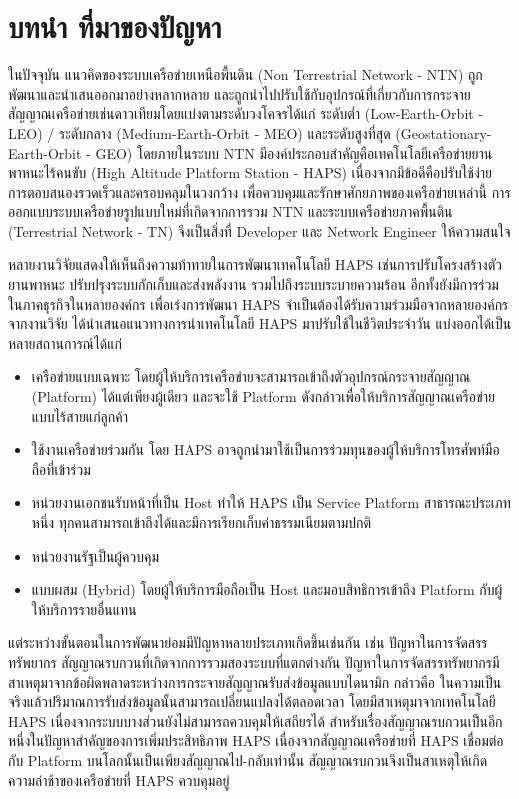 \section{บทนำ ที่มาของปัญหา}

ในปัจจุบัน แนวคิดของระบบเครือข่ายเหนือพื้นดิน (Non Terrestrial Network - NTN) ถูกพัฒนาและนำเสนออกมาอย่างหลากหลาย
และถูกนำไปปรับใช้กับอุปกรณ์ที่เกี่ยวกับการกระจายสัญญาณเครือข่ายเช่นดาวเทียมโดยแบ่งตามระดับวงโคจรได้แก่ ระดับต่ำ (Low-Earth-Orbit - LEO) /
ระดับกลาง (Medium-Earth-Orbit - MEO) และระดับสูงที่สุด (Geostationary-Earth-Orbit - GEO)
โดยภายในระบบ NTN มีองค์ประกอบสำคัญคือเทคโนโลยีเครือข่ายยานพาหนะไร้คนขับ (High Altitude Platform Station - HAPS)
เนื่องจากมีข้อดีคือปรับใช้ง่าย การตอบสนองรวดเร็วและครอบคลุมในวงกว้าง เพื่อควบคุมและรักษาศักยภาพของเครือข่ายเหล่านี้ 
การออกแบบระบบเครือข่ายรูปแบบใหม่ที่เกิดจากการรวม NTN และระบบเครือข่ายภาคพื้นดิน (Terrestrial Network - TN) 
จึงเป็นสิ่งที่ Developer และ Network Engineer ให้ความสนใจ

หลายงานวิจัยแสดงให้เห็นถึงความท้าทายในการพัฒนาเทคโนโลยี HAPS เช่นการปรับโครงสร้างตัวยานพาหนะ ปรับปรุงระบบกักเก็บและส่งพลังงาน
รวมไปถึงระบบระบายความร้อน อีกทั้งยังมีการร่วมในภาคธุรกิจในหลายองค์กร เพื่อเร่งการพัฒนา HAPS จำเป็นต้องได้รับความร่วมมือจากหลายองค์กร
จากงานวิจัย \cite{gsmatowers}
ได้นำเสนอแนวทางการนำเทคโนโลยี HAPS มาปรับใช้ในชีวิตประจำวัน แบ่งออกได้เป็นหลายสถานการณ์ได้แก่

\begin{itemize}
    \item เครือข่ายแบบเฉพาะ โดยผู้ให้บริการเครือข่ายจะสามารถเข้าถึงตัวอุปกรณ์กระจายสัญญาณ (Platform) ได้แต่เพียงผู้เดียว 
    และจะใช้ Platform ดังกล่าวเพื่อให้บริการสัญญาณเครือข่ายแบบไร้สายแก่ลูกค้า
    \item ใช้งานเครือข่ายร่วมกัน โดย HAPS อาจถูกนำมาใช้เป็นการร่วมทุนของผู้ให้บริการโทรศัพท์มือถือที่เข้าร่วม
    \item หน่วยงานเอกชนรับหน้าที่เป็น Host ทำให้ HAPS เป็น Service Platform สาธารณะประเภทหนึ่ง
    ทุกคนสามารถเข้าถึงได้และมีการเรียกเก็บค่าธรรมเนียมตามปกติ
    \item หน่วยงานรัฐเป็นผู้ควบคุม
    \item แบบผสม (Hybrid) โดยผู้ให้บริการมือถือเป็น Host และมอบสิทธิการเข้าถึง Platform กับผู้ให้บริการรายอื่นแทน
\end{itemize}

แต่ระหว่างขั้นตอนในการพัฒนาย่อมมีปัญหาหลายประเภทเกิดขึ้นเช่นกัน เช่น ปัญหาในการจัดสรรทรัพยากร 
สัญญาณรบกวนที่เกิดจากการรวมสองระบบที่แตกต่างกัน ปัญหาในการจัดสรรทรัพยากรมีสาเหตุมาจากข้อผิดพลาดระหว่างการกระจายสัญญาณรับส่งข้อมูลแบบไดนามิก 
กล่าวคือ ในความเป็นจริงแล้วปริมาณการรับส่งข้อมูลนั้นสามารถเปลี่ยนแปลงได้ตลอดเวลา โดยมีสาเหตุมาจากเทคโนโลยี HAPS
เนื่องจากระบบบางส่วนยังไม่สามารถควบคุมให้เสถียรได้ สำหรับเรื่องสัญญาณรบกวนเป็นอีกหนึ่งในปัญหาสำคัญของการเพิ่มประสิทธิภาพ HAPS เนื่องจากสัญญาณเครือข่ายที่ HAPS เชื่อมต่อกับ Platform
บนโลกนั้นเป็นเพียงสัญญาณไป-กลับเท่านั้น สัญญาณรบกวนจึงเป็นสาเหตุให้เกิดความล่าช้าของเครือข่ายที่ HAPS ควบคุมอยู่

